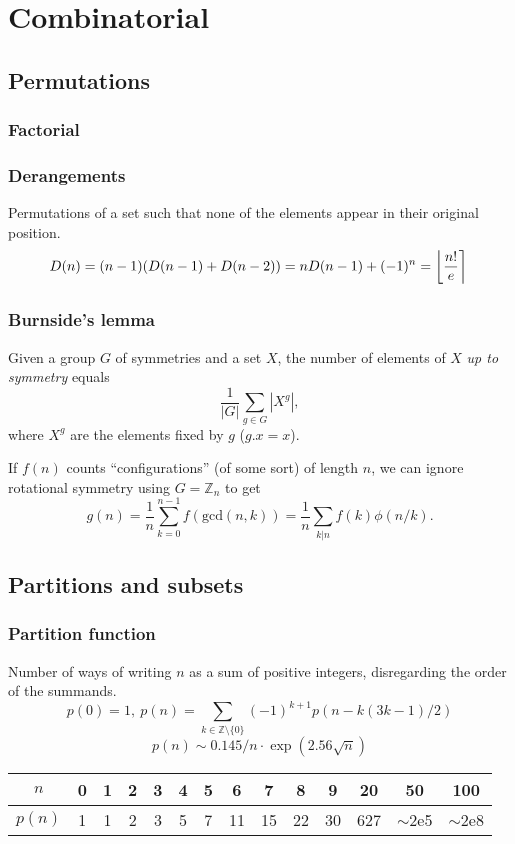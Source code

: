 \chapter{Combinatorial}

\section{Permutations}
	\subsection{Factorial}

	\subsection{Derangements}
		Permutations of a set such that none of the elements appear in their original position.
		\[ \mkern-2mu D(n) = (n-1)(D(n-1)+D(n-2)) = n D(n-1)+(-1)^n = \left\lfloor\frac{n!}{e}\right\rceil \]

	\subsection{Burnside's lemma}
		Given a group $G$ of symmetries and a set $X$, the number of elements of $X$ \emph{up to symmetry} equals
		 \[ {\frac {1}{|G|}}\sum _{{g\in G}}|X^{g}|, \]
		 where $X^{g}$ are the elements fixed by $g$ ($g.x = x$).

		 If $f(n)$ counts ``configurations'' (of some sort) of length $n$, we can ignore rotational symmetry using $G = \mathbb Z_n$ to get
		 \[ g(n) = \frac 1 n \sum_{k=0}^{n-1}{f(\text{gcd}(n, k))} = \frac 1 n \sum_{k|n}{f(k)\phi(n/k)}. \]

\section{Partitions and subsets}
	\subsection{Partition function}
		Number of ways of writing $n$ as a sum of positive integers, disregarding the order of the summands.
		\[ p(0) = 1,\ p(n) = \sum_{k \in \mathbb Z \setminus \{0\}}{(-1)^{k+1} p(n - k(3k-1) / 2)} \]
		\[ p(n) \sim 0.145 / n \cdot \exp(2.56 \sqrt{n}) \]

		\begin{center}
		\begin{tabular}{c|c@{\ }c@{\ }c@{\ }c@{\ }c@{\ }c@{\ }c@{\ }c@{\ }c@{\ }c@{\ }c@{\ }c@{\ }c}
			$n$    & 0 & 1 & 2 & 3 & 4 & 5 & 6  & 7  & 8  & 9  & 20  & 50  & 100 \\ \hline
			$p(n)$ & 1 & 1 & 2 & 3 & 5 & 7 & 11 & 15 & 22 & 30 & 627 & $\mathtt{\sim}$2e5 & $\mathtt{\sim}$2e8 \\
		\end{tabular}
		\end{center}

